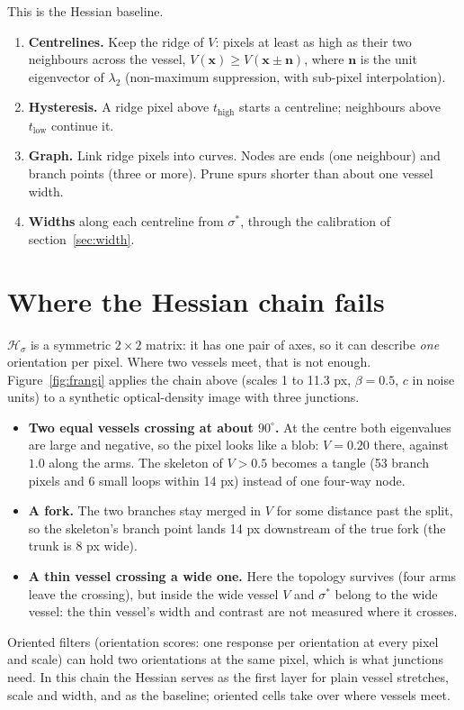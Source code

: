 \documentclass[11pt]{article}
\newcommand{\x}{\mathbf{x}}
\begin{document}
This is the Hessian baseline.
\begin{enumerate}
  \item \textbf{Centrelines.} Keep the ridge of $V$: pixels at least as high as their two neighbours across the
        vessel, $V(\x) \ge V(\x \pm \mathbf n)$, where $\mathbf n$ is the unit eigenvector of $\lambda_2$
        (non-maximum suppression, with sub-pixel interpolation).
  \item \textbf{Hysteresis.} A ridge pixel above $t_\mathrm{high}$ starts a centreline; neighbours above
        $t_\mathrm{low}$ continue it.
  \item \textbf{Graph.} Link ridge pixels into curves. Nodes are ends (one neighbour) and branch points (three or
        more). Prune spurs shorter than about one vessel width.
  \item \textbf{Widths} along each centreline from $\sigma^*$, through the calibration of
        section~\ref{sec:width}.
\end{enumerate}

\section{Where the Hessian chain fails}\label{sec:limits}

$\mathcal H_\sigma$ is a symmetric $2 \times 2$ matrix: it has one pair of axes, so it can describe \emph{one}
orientation per pixel. Where two vessels meet, that is not enough. Figure~\ref{fig:frangi} applies the chain above
(scales 1 to 11.3 px, $\beta = 0.5$, $c$ in noise units) to a synthetic optical-density image with three
junctions.
\begin{itemize}
  \item \textbf{Two equal vessels crossing at about $90^\circ$.} At the centre both eigenvalues are large and
        negative, so the pixel looks like a blob: $V = 0.20$ there, against $1.0$ along the arms. The skeleton
        of $V > 0.5$ becomes a tangle (53 branch pixels and 6 small loops within 14 px) instead of one
        four-way node.
  \item \textbf{A fork.} The two branches stay merged in $V$ for some distance past the split, so the skeleton's
        branch point lands 14 px downstream of the true fork (the trunk is 8 px wide).
  \item \textbf{A thin vessel crossing a wide one.} Here the topology survives (four arms leave the crossing), but
        inside the wide vessel $V$ and $\sigma^*$ belong to the wide vessel: the thin vessel's width and contrast
        are not measured where it crosses.
\end{itemize}
Oriented filters (orientation scores: one response per orientation at every pixel and scale) can hold two
orientations at the same pixel, which is what junctions need. In this chain the Hessian serves as the first layer
for plain vessel stretches, scale and width, and as the baseline; oriented cells take over where vessels meet.
\end{document}
